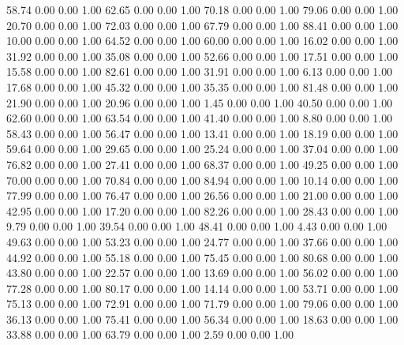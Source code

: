    58.74   0.00   0.00   1.00
   62.65   0.00   0.00   1.00
   70.18   0.00   0.00   1.00
   79.06   0.00   0.00   1.00
   20.70   0.00   0.00   1.00
   72.03   0.00   0.00   1.00
   67.79   0.00   0.00   1.00
   88.41   0.00   0.00   1.00
   10.00   0.00   0.00   1.00
   64.52   0.00   0.00   1.00
   60.00   0.00   0.00   1.00
   16.02   0.00   0.00   1.00
   31.92   0.00   0.00   1.00
   35.08   0.00   0.00   1.00
   52.66   0.00   0.00   1.00
   17.51   0.00   0.00   1.00
   15.58   0.00   0.00   1.00
   82.61   0.00   0.00   1.00
   31.91   0.00   0.00   1.00
    6.13   0.00   0.00   1.00
   17.68   0.00   0.00   1.00
   45.32   0.00   0.00   1.00
   35.35   0.00   0.00   1.00
   81.48   0.00   0.00   1.00
   21.90   0.00   0.00   1.00
   20.96   0.00   0.00   1.00
    1.45   0.00   0.00   1.00
   40.50   0.00   0.00   1.00
   62.60   0.00   0.00   1.00
   63.54   0.00   0.00   1.00
   41.40   0.00   0.00   1.00
    8.80   0.00   0.00   1.00
   58.43   0.00   0.00   1.00
   56.47   0.00   0.00   1.00
   13.41   0.00   0.00   1.00
   18.19   0.00   0.00   1.00
   59.64   0.00   0.00   1.00
   29.65   0.00   0.00   1.00
   25.24   0.00   0.00   1.00
   37.04   0.00   0.00   1.00
   76.82   0.00   0.00   1.00
   27.41   0.00   0.00   1.00
   68.37   0.00   0.00   1.00
   49.25   0.00   0.00   1.00
   70.00   0.00   0.00   1.00
   70.84   0.00   0.00   1.00
   84.94   0.00   0.00   1.00
   10.14   0.00   0.00   1.00
   77.99   0.00   0.00   1.00
   76.47   0.00   0.00   1.00
   26.56   0.00   0.00   1.00
   21.00   0.00   0.00   1.00
   42.95   0.00   0.00   1.00
   17.20   0.00   0.00   1.00
   82.26   0.00   0.00   1.00
   28.43   0.00   0.00   1.00
    9.79   0.00   0.00   1.00
   39.54   0.00   0.00   1.00
   48.41   0.00   0.00   1.00
    4.43   0.00   0.00   1.00
   49.63   0.00   0.00   1.00
   53.23   0.00   0.00   1.00
   24.77   0.00   0.00   1.00
   37.66   0.00   0.00   1.00
   44.92   0.00   0.00   1.00
   55.18   0.00   0.00   1.00
   75.45   0.00   0.00   1.00
   80.68   0.00   0.00   1.00
   43.80   0.00   0.00   1.00
   22.57   0.00   0.00   1.00
   13.69   0.00   0.00   1.00
   56.02   0.00   0.00   1.00
   77.28   0.00   0.00   1.00
   80.17   0.00   0.00   1.00
   14.14   0.00   0.00   1.00
   53.71   0.00   0.00   1.00
   75.13   0.00   0.00   1.00
   72.91   0.00   0.00   1.00
   71.79   0.00   0.00   1.00
   79.06   0.00   0.00   1.00
   36.13   0.00   0.00   1.00
   75.41   0.00   0.00   1.00
   56.34   0.00   0.00   1.00
   18.63   0.00   0.00   1.00
   33.88   0.00   0.00   1.00
   63.79   0.00   0.00   1.00
    2.59   0.00   0.00   1.00
